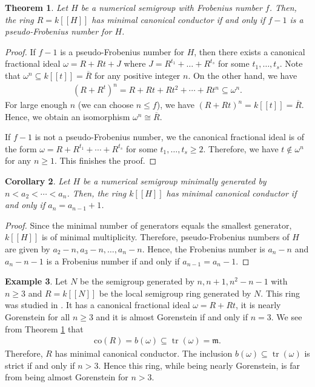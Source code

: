 \documentclass[12pt]{amsart}
\newcommand\co{\mathrm{co}}
\newcommand{\m}{\mathfrak{m}}
\newtheorem{theorem}{Theorem}[section]
\newtheorem{corollary}[theorem]{Corollary}
\theoremstyle{definition}
\newtheorem{example}[theorem]{Example}
\DeclareMathOperator{\tr}{\mathrm{tr}}
\begin{document}
\begin{theorem}\label{pseudo-frobenius-theorem}
    Let $H$ be a numerical semigroup with Frobenius number $f$. Then, the ring $R = k[[H]]$ has minimal canonical conductor if and only if $f-1$ is a pseudo-Frobenius number for $H$. 
\end{theorem}
\begin{proof}
    If $f-1$ is a pseudo-Frobenius number for $H$, then there exists a canonical fractional ideal $\omega = R + Rt + J$ where $J = R^{t_1} + \ldots + R^{t_s}$ for some $t_1, \ldots, t_s$. Note that $\omega^n \subseteq k[[t]] = \overline{R}$ for any positive integer $n$. On the other hand, we have 
    \begin{align*}
    (R+R^t)^n = R + Rt + Rt^2 + \cdots + Rt^n \subseteq \omega^n.
    \end{align*}
    For large enough $n$ (we can choose $n \leq f$), we have $(R+Rt)^n = k[[t]] = \overline{R}$. Hence, we obtain an isomorphism $\omega^n \cong \overline{R}$.

    If $f-1$ is not a pseudo-Frobenius number, we the canonical fractional ideal is of the form $\omega = R + R^{t_1} + \cdots + R^{t_s}$ for some $t_1, \ldots, t_s \geq 2$. Therefore, we have $t \notin \omega^n$ for any $n \geq 1$. This finishes the proof. 
\end{proof}
\begin{corollary}
    Let $H$ be a numerical semigroup minimally generated by $n< a_2< \cdots < a_n$. Then, the ring $k[[H]]$ has minimal canonical conductor if and only if $a_{n} = a_{n-1} +1$.
\end{corollary}
\begin{proof}
    Since the minimal number of generators equals the smallest generator, $k[[H]]$ is of minimal multiplicity. Therefore, pseudo-Frobenius numbers of $H$ are given by $a_2 - n, a_3-n, \ldots, a_n - n$. Hence, the Frobenius number is $a_n-n$ and $a_n-n-1$ is a Frobenius number if and only if $a_{n-1} = a_n - 1$.   
\end{proof}
\begin{example}
    Let $N$ be the semigroup generated by $n, n+1, n^2-n-1$ with $n \geq 3$ and $R = k[[N]]$ be the local semigroup ring generated by $N$. This ring was studied in \cite[Example 3.13]{Kumashiro}. It has a canonical fractional ideal $\omega = R + Rt$, it is nearly Gorenstein for all $n \geq 3$ and it is almost Gorenstein if and only if $n = 3$. We see from Theorem \ref{pseudo-frobenius-theorem} that 
    \begin{align*}
        \co(R) = b(\omega) \subseteq \tr(\omega) = \m.
    \end{align*}
    Therefore, $R$ has minimal canonical conductor. The inclusion $b(\omega) \subseteq \tr(\omega)$ is strict if and only if $n > 3$. Hence this ring, while being nearly Gorenstein, is far from being almost Gorenstein for $n > 3$. 
\end{example}
\end{document}
